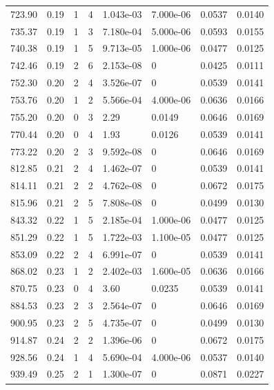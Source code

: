 \documentclass[preview]{standalone}
\begin{document}
{{{\begin{tabular}{L{1.2cm}C{1.2cm} C{0.3cm}C{0.5cm} C{1.4cm}C{1.4cm} C{1.4cm}C{1.4cm}}
  723.90  &  0.19  & 1     &  4 &  1.043e-03  & 7.000e-06  & 0.0537 &  0.0140   \\ 
  735.37  &  0.19  & 1     &  3 &  7.180e-04  & 5.000e-06  & 0.0593 &  0.0155   \\ 
  740.38  &  0.19  & 1     &  5 &  9.713e-05  & 1.000e-06  & 0.0477 &  0.0125   \\ 
  742.46  &  0.19  & 2     &  6 &  2.153e-08  & 0  & 0.0425 &  0.0111   \\ 
  752.30  &  0.20  & 2     &  4 &  3.526e-07  & 0  & 0.0539 &  0.0141   \\ 
  753.76  &  0.20  & 1     &  2 &  5.566e-04  & 4.000e-06  & 0.0636 &  0.0166   \\ 
  755.20  &  0.20  & 0     &  3 &  2.29  & 0.0149  & 0.0646 &  0.0169   \\ 
  770.44  &  0.20  & 0     &  4 &  1.93  & 0.0126  & 0.0539 &  0.0141   \\ 
  773.22  &  0.20  & 2     &  3 &  9.592e-08  & 0  & 0.0646 &  0.0169   \\ 
  812.85  &  0.21  & 2     &  4 &  1.462e-07  & 0  & 0.0539 &  0.0141   \\ 
  814.11  &  0.21  & 2     &  2 &  4.762e-08  & 0  & 0.0672 &  0.0175   \\ 
  815.96  &  0.21  & 2     &  5 &  7.808e-08  & 0  & 0.0499 &  0.0130   \\ 
  843.32  &  0.22  & 1     &  5 &  2.185e-04  & 1.000e-06  & 0.0477 &  0.0125   \\ 
  851.29  &  0.22  & 1     &  5 &  1.722e-03  & 1.100e-05  & 0.0477 &  0.0125   \\ 
  853.09  &  0.22  & 2     &  4 &  6.991e-07  & 0  & 0.0539 &  0.0141   \\ 
  868.02  &  0.23  & 1     &  2 &  2.402e-03  & 1.600e-05  & 0.0636 &  0.0166   \\ 
  870.75  &  0.23  & 0     &  4 &  3.60  & 0.0235  & 0.0539 &  0.0141   \\ 
  884.53  &  0.23  & 2     &  3 &  2.564e-07  & 0  & 0.0646 &  0.0169   \\ 
  900.95  &  0.23  & 2     &  5 &  4.735e-07  & 0  & 0.0499 &  0.0130   \\ 
  914.87  &  0.24  & 2     &  2 &  1.396e-06  & 0  & 0.0672 &  0.0175   \\ 
  928.56  &  0.24  & 1     &  4 &  5.690e-04  & 4.000e-06  & 0.0537 &  0.0140   \\ 
  939.49  &  0.25  & 2     &  1 &  1.300e-07  & 0  & 0.0871 &  0.0227   \\ 

\end{tabular}}}}
\end{document}
